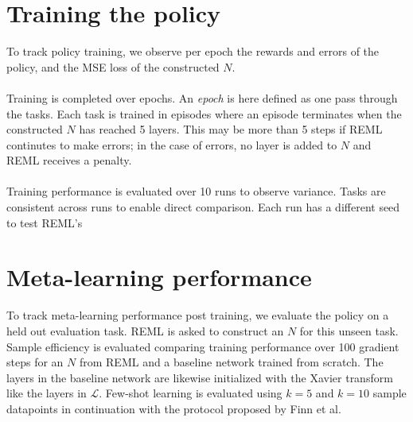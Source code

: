 \section{Training the policy}
To track policy training, we observe per epoch the rewards and errors of the policy, and 
the MSE loss of the constructed $N$.
\\\\
Training is completed over epochs.
An \textit{epoch} is here defined as one pass through the tasks. 
Each task is trained in episodes where an episode terminates when the constructed
$N$ has reached 5 layers. This may be more than 5 steps if REML continutes to make 
errors; in the case of errors, no layer is added to $N$ and REML receives a penalty. 
\\\\
Training performance is evaluated over 10 runs to observe variance. Tasks are 
consistent across runs to enable direct comparison. Each run has a different seed
to test REML's 
\section{Meta-learning performance}
To track meta-learning performance post training, we evaluate the policy on a held
out evaluation task.
REML is asked to construct an $N$ for this unseen task. Sample efficiency is evaluated
comparing training performance over 100 gradient steps for an $N$ from REML and a 
baseline network trained from scratch. The layers in the baseline network are likewise
initialized with the Xavier transform like the layers in $\mathcal{L}$. Few-shot 
learning is evaluated using $k=5$ and $k=10$ sample datapoints in continuation with 
the protocol proposed by Finn et al.



